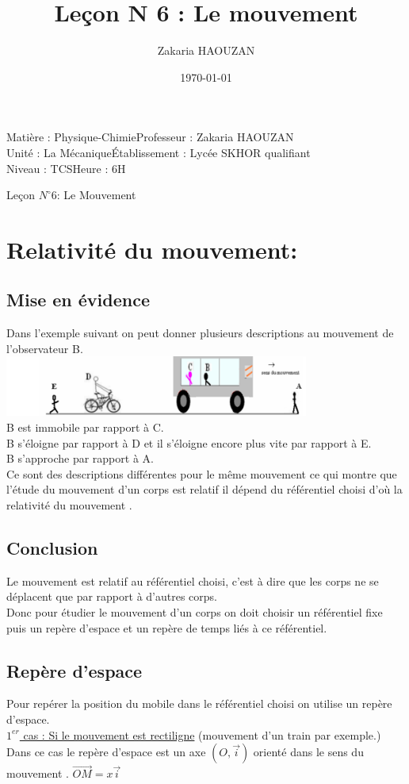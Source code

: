 \documentclass[12pt]{article}
\title{Leçon N 6 : Le mouvement}
\author{Zakaria HAOUZAN}
\date{\today}
\newcommand\headerMe[2]{\noindent{}#1\hfill#2}
\begin{document}
\headerMe{Matière : Physique-Chimie}{Professeur : Zakaria HAOUZAN}\\
\headerMe{Unité : La Mécanique}{Établissement : Lycée SKHOR qualifiant}\\
\headerMe{Niveau : TCS}{Heure : 6H}\\

\begin{center}

    \Large{Leçon $N^{\circ}6$: \color{red}Le Mouvement}
\end{center}

\section{\color{red}Relativité du mouvement:}
\subsection{\color{green}Mise en évidence}
Dans l'exemple suivant on peut donner plusieurs descriptions au mouvement de l'observateur B.\\
\includegraphics[width=0.75\textwidth]{./img/img00.png}\\
B est immobile par rapport à C.\\
B s'éloigne par rapport à D et il s'éloigne encore plus vite par rapport à E.\\
B s'approche par rapport à A.\\
Ce sont des descriptions différentes pour le même mouvement ce qui montre que l'étude du mouvement d'un
corps est relatif il dépend du référentiel choisi d’où la relativité du mouvement .


\subsection{Conclusion}
Le mouvement est relatif au référentiel choisi, c'est à dire que les corps ne se déplacent que par rapport à
d'autres corps.\\
Donc pour étudier le mouvement d'un corps on doit choisir un référentiel fixe puis un repère d'espace et un
repère de temps liés à ce référentiel.

\subsection{Repère d'espace}
Pour repérer la position du mobile dans le référentiel choisi on utilise un repère d'espace.\\
\underline{$1^{er}$ cas : Si le mouvement est rectiligne} (mouvement d'un train par exemple.)\\
Dans ce cas le repère d'espace est un axe $(O, \vec{i})$ orienté dans le sens du mouvement . $\overrightarrow{OM} = x\vec{i}$
\end{document}
